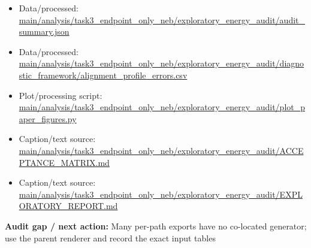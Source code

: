 \documentclass[10pt]{article}
\newcommand{\statusline}[1]{\colorbox{gray!12}{\parbox{0.96\linewidth}{#1}}}
\begin{document}
\begin{itemize}[leftmargin=1.4em,noitemsep]
\item Data/processed: \begingroup\scriptsize\url{main/analysis/task3_endpoint_only_neb/exploratory_energy_audit/audit_summary.json}\endgroup
\item Data/processed: \begingroup\scriptsize\url{main/analysis/task3_endpoint_only_neb/exploratory_energy_audit/diagnostic_framework/alignment_profile_errors.csv}\endgroup
\item Plot/processing script: \begingroup\scriptsize\url{main/analysis/task3_endpoint_only_neb/exploratory_energy_audit/plot_paper_figures.py}\endgroup
\item Caption/text source: \begingroup\scriptsize\url{main/analysis/task3_endpoint_only_neb/exploratory_energy_audit/ACCEPTANCE_MATRIX.md}\endgroup
\item Caption/text source: \begingroup\scriptsize\url{main/analysis/task3_endpoint_only_neb/exploratory_energy_audit/EXPLORATORY_REPORT.md}\endgroup
\end{itemize}
\statusline{\textbf{Audit gap / next action:} Many per-path exports have no co-located generator; use the parent renderer and record the exact input tables}
\vfill
\clearpage
\end{document}
